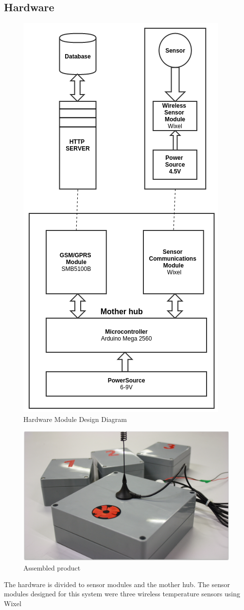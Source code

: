 \subsection{Hardware}
\begin{figure}
\centering
\includegraphics[width=0.5\linewidth]{graphics/HardwareMDD}
\caption{Hardware Module Design Diagram\label{fig:HardwareMDD}}
\end{figure}
\begin{figure}
\centering
\includegraphics[width=0.8\linewidth]{graphics/Our_product}
\caption{Assembled product\label{fig:Our_product}}
\end{figure}
The hardware is divided to sensor modules and the mother hub. The sensor modules 
designed for this system were three wireless temperature sensors using Wixel\cite{wixel}
